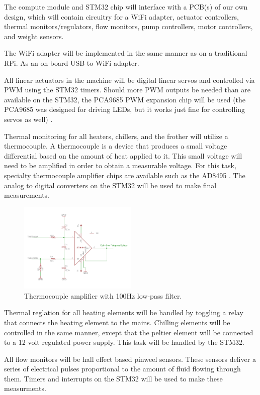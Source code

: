 \documentclass[conference]{IEEEtran}
\begin{document}
The compute module and STM32 chip will interface with a PCB(s) of our own
design, which will contain circuitry for a WiFi adapter, actuator controllers, thermal
monitors/regulators, flow monitors, pump controllers, motor controllers, and
weight sensors.

The WiFi adapter will be implemented in the same manner as on a traditional RPi.
As an on-board USB to WiFi adapter.

All linear actuators in the machine will be digital linear servos and controlled
via PWM using the STM32 timers. Should more PWM outputs be needed than are
available on the STM32, the PCA9685 PWM expansion chip will be used (the
PCA9685 was designed for driving LEDs, but it works just fine for controlling
servos as well) \cite{PWM}.

Thermal monitoring for all heaters, chillers, and the frother will utilize a
thermocouple. A thermocouple is a device that produces a small voltage
differential based on the amount of heat applied to it. This small voltage will
need to be amplified in order to obtain a measurable voltage. For this task,
specialty thermocouple amplifier chips are available such as the AD8495
\cite{thermo}.
The analog to digital converters on the STM32 will be used to make final measurements.

\begin{figure}
  \centering
    \includegraphics[width=0.5\textwidth]{ThermoAmp}
    \caption{Thermocouple amplifier with 100Hz low-pass filter.}
\end{figure}

Thermal reglation for all heating elements will be handled by toggling a relay
that connects the heating element to the mains. Chilling elements will be
controlled in the same manner, except that the peltier element will be connected
to a 12 volt regulated power supply. This task will be handled by the STM32.

All flow monitors will be hall effect based pinweel sensors. These sensors
deliver a series of electrical pulses proportional to the amount of fluid
flowing through them. Timers and interrupts on the STM32 will be used to make
these measurments. 
\end{document}
